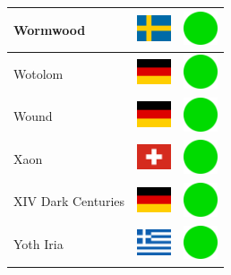 \documentclass[12pt, a4paper, twoside]{report}
\begin{document}
\begin{center}
\begin{longtable}{|p{5cm}|p{2cm}|p{2cm}|}
 Wormwood                                                   & \includegraphics[width=1cm]{../img/flags/se} &   \includegraphics[width=1cm]{../likes/y} \\ \hline
 Wotolom                                                    & \includegraphics[width=1cm]{../img/flags/de} &   \includegraphics[width=1cm]{../likes/y} \\ \hline
 Wound                                                      & \includegraphics[width=1cm]{../img/flags/de} &   \includegraphics[width=1cm]{../likes/y} \\ \hline
 Xaon                                                       & \includegraphics[width=1cm]{../img/flags/ch} &   \includegraphics[width=1cm]{../likes/y} \\ \hline
 XIV Dark Centuries                                         & \includegraphics[width=1cm]{../img/flags/de} &   \includegraphics[width=1cm]{../likes/y} \\ \hline
 Yoth Iria                                                  & \includegraphics[width=1cm]{../img/flags/gr} &   \includegraphics[width=1cm]{../likes/y} \\ \hline

\end{longtable}
\end{center}
\end{document}
